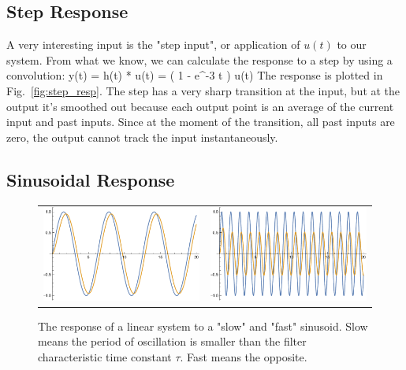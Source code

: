 \subsection{Step Response}


A very interesting input is the "step input", or application of $u(t)$ to our system.  From what we know, we can calculate the response to a step by using a convolution:
\be
	y(t) = h(t) * u(t) = \left( 1 - e^{-3 t} \right) u(t) 
\ee
The response is plotted in Fig.~\ref{fig:step_resp}. The step has a very sharp transition at the input, but at the output it's smoothed out because each output point is an average of the current input and past inputs.  Since at the moment of the transition, all past inputs are zero, the output cannot track the input instantaneously.  
 




\subsection{Sinusoidal Response}


\begin{figure}[tb]
\begin{center}
\begin{tabular}{cc}
\includegraphics[width=.5\columnwidth]{slow_sine.pdf} &
\includegraphics[width=.5\columnwidth]{fast_sine.pdf} \\
\end{tabular}
\end{center}
\caption{The response of a linear system to a "slow" and "fast" sinusoid.  Slow means the period of oscillation is smaller than the filter characteristic time constant $\tau$.  Fast means the opposite. } \label{fig:fast_slow_resp}
\end{figure}



